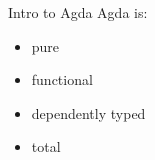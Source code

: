 \documentclass{beamer}
\begin{document}
\begin{frame}{Intro to Agda}
Agda is:
\begin{itemize}
  \item pure
  \item functional
  \item dependently typed
  \item total
\end{itemize}

\end{frame}
\end{document}

